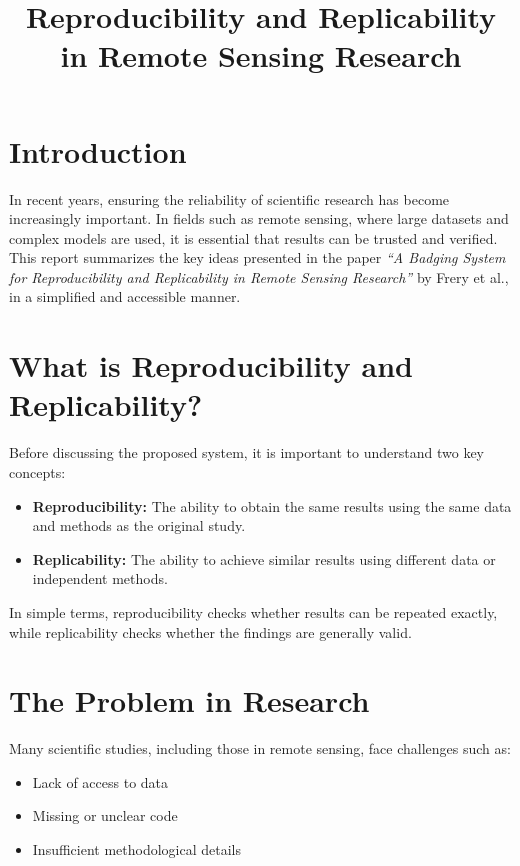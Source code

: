 \documentclass[12pt]{article}
\title{ Reproducibility and Replicability in Remote Sensing Research}
\author{}
\date{}
\begin{document}
	
	\maketitle
	
	\section{Introduction}
	
	In recent years, ensuring the reliability of scientific research has become increasingly important. In fields such as remote sensing, where large datasets and complex models are used, it is essential that results can be trusted and verified. This report summarizes the key ideas presented in the paper \textit{``A Badging System for Reproducibility and Replicability in Remote Sensing Research''} by Frery et al., in a simplified and accessible manner.
	
	\section{What is Reproducibility and Replicability?}
	
	Before discussing the proposed system, it is important to understand two key concepts:
	
	\begin{itemize}
		\item \textbf{Reproducibility:} The ability to obtain the same results using the same data and methods as the original study.
		\item \textbf{Replicability:} The ability to achieve similar results using different data or independent methods.
	\end{itemize}
	
	In simple terms, reproducibility checks whether results can be repeated exactly, while replicability checks whether the findings are generally valid.
	
	\section{The Problem in Research}
	
	Many scientific studies, including those in remote sensing, face challenges such as:
	\begin{itemize}
		\item Lack of access to data
		\item Missing or unclear code
		\item Insufficient methodological details
	\end{itemize}
	
\end{document}
